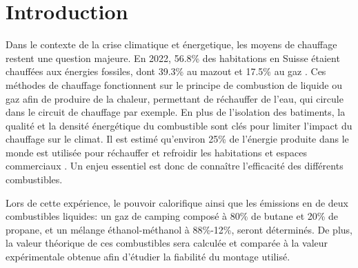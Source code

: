 \section{Introduction}

Dans le contexte de la crise climatique et énergetique, les moyens de chauffage restent une question majeure. En 2022, 56.8\% des habitations en Suisse étaient chauffées aux énergies fossiles, dont 39.3\% au mazout et 17.5\% au gaz \cite{chauffage}. Ces méthodes de chauffage fonctionnent sur le principe de combustion de liquide ou gaz afin de produire de la chaleur, permettant de réchauffer de l'eau, qui circule dans le circuit de chauffage par exemple. En plus de l'isolation des batiments, la qualité et la densité énergétique du combustible sont clés pour limiter l'impact du chauffage sur le climat. Il est estimé qu'environ 25\% de l'énergie produite dans le monde est utilisée pour réchauffer et refroidir les habitations et espaces commerciaux \cite{energie-chauffage}. Un enjeu essentiel est donc de connaître l'efficacité des différents combustibles.

Lors de cette expérience, le pouvoir calorifique ainsi que les émissions en  de deux combustibles liquides: un gaz de camping composé à 80\% de butane et 20\% de propane, et un mélange éthanol-méthanol à 88\%-12\%, seront déterminés. De plus, la valeur théorique de ces combustibles sera calculée et comparée à la valeur expérimentale obtenue afin d'étudier la fiabilité du montage utilisé.